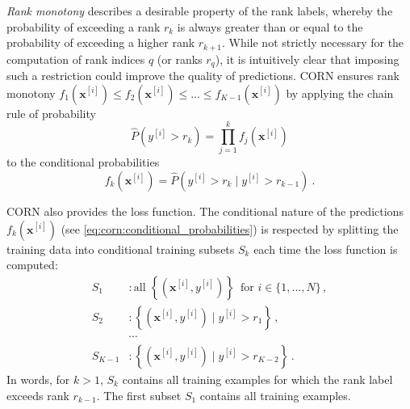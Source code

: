 \emph{Rank monotony} describes a desirable property of the rank labels,
whereby the probability of exceeding a rank $r_k$ is always greater than or equal to the probability of exceeding a higher rank $r_{k+1}$.
%
While not strictly necessary for the computation of rank indices $q$ (or ranks $r_q$),
it is intuitively clear that imposing such a restriction could improve the quality of predictions.
%
\Ac{CORN} ensures rank monotony
  $f_1(\mathbf{x}^{[i]}) \leq f_2(\mathbf{x}^{[i]}) \leq \ldots \leq f_{K-1}(\mathbf{x}^{[i]})$
by applying the chain rule of probability
\begin{equation}
  \hat{P}\left(y^{[i]} > r_k\right) = \prod_{j=1}^k f_j(\mathbf{x}^{[i]})
\end{equation}
to the conditional probabilities
\begin{equation}
  f_k(\mathbf{x}^{[i]}) = \hat{P}\left( y^{[i]} > r_k \mid y^{[i]} > r_{k-1} \right) \ .
  \label{eq:corn:conditional_probabilities}
\end{equation}
%

\Ac{CORN} also provides the loss function.
The conditional nature of the predictions $f_k(\mathbf{x}^{[i]})$
  (see \autoref{eq:corn:conditional_probabilities})
is respected
by splitting the training data into conditional training subsets $S_k$
  each time the loss function is computed:
\begin{align*}
  S_1 &: \text{all } \left\{\left( \mathbf{x}^{[i]}, y^{[i]} \right)\right\} \, \text{ for } i \in \{1, \ldots, N\} \, , \\
  S_2 &: \left\{\left( \mathbf{x}^{[i]}, y^{[i]} \right) \mid y^{[i]} > r_1 \right\} \, , \\
  &\cdots \\
  S_{K-1} &: \left\{\left( \mathbf{x}^{[i]}, y^{[i]} \right) \mid y^{[i]} > r_{K-2} \right\} \, .
\end{align*}
In words,
for $k > 1$,
  $S_k$ contains all training examples
  for which the rank label exceeds rank $r_{k-1}$.
The first subset $S_1$ contains all training examples.

